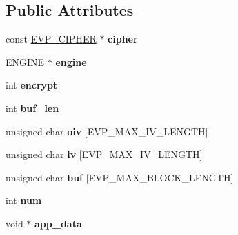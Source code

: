 \subsection*{Public Attributes}
\begin{DoxyCompactItemize}
\item 
\mbox{\label{structevp__cipher__ctx__st_a54860c2aa28ae69bff3ada58996b4bc3}} 
const \hyperlink{structevp__cipher__st}{E\+V\+P\+\_\+\+C\+I\+P\+H\+ER} $\ast$ {\bfseries cipher}
\item 
\mbox{\label{structevp__cipher__ctx__st_a1ab6fb61a2574c641f9498c8731715d3}} 
E\+N\+G\+I\+NE $\ast$ {\bfseries engine}
\item 
\mbox{\label{structevp__cipher__ctx__st_ad6b7abc39f975d0d324be0fef7665cc6}} 
int {\bfseries encrypt}
\item 
\mbox{\label{structevp__cipher__ctx__st_abf70e5abfb9df24c74ad2297c7d53ae0}} 
int {\bfseries buf\+\_\+len}
\item 
\mbox{\label{structevp__cipher__ctx__st_a9b3a75184a5f5d29fbccf925503fe302}} 
unsigned char {\bfseries oiv} \mbox{[}E\+V\+P\+\_\+\+M\+A\+X\+\_\+\+I\+V\+\_\+\+L\+E\+N\+G\+TH\mbox{]}
\item 
\mbox{\label{structevp__cipher__ctx__st_a1b3aa9f85ae704113077fb77b5c9db8b}} 
unsigned char {\bfseries iv} \mbox{[}E\+V\+P\+\_\+\+M\+A\+X\+\_\+\+I\+V\+\_\+\+L\+E\+N\+G\+TH\mbox{]}
\item 
\mbox{\label{structevp__cipher__ctx__st_a433caab60fc2419a460e4006b0734352}} 
unsigned char {\bfseries buf} \mbox{[}E\+V\+P\+\_\+\+M\+A\+X\+\_\+\+B\+L\+O\+C\+K\+\_\+\+L\+E\+N\+G\+TH\mbox{]}
\item 
\mbox{\label{structevp__cipher__ctx__st_ae09b6c40179528583d8d7b3cc623bd87}} 
int {\bfseries num}
\item 
\mbox{\label{structevp__cipher__ctx__st_a00e9113f48a52bc9b1b95cc01a2560fa}} 
void $\ast$ {\bfseries app\+\_\+data}

\end{DoxyCompactItemize}
